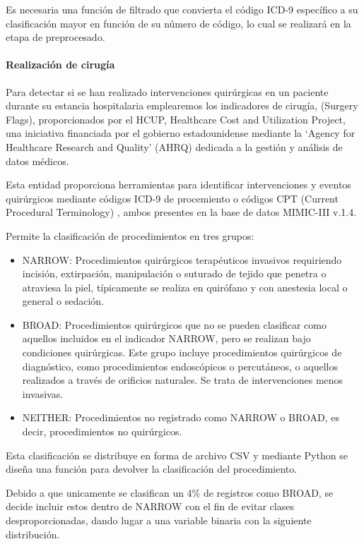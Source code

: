\documentclass{report}
\begin{document}
Es necesaria una función de filtrado que convierta el código ICD-9
específico a su clasificación mayor en función de su número de código,
lo cual se realizará en la etapa de preprocesado.

\paragraph{Realización de cirugía}

Para detectar si se han realizado intervenciones quirúrgicas en un
paciente durante su estancia hospitalaria emplearemos los indicadores de
cirugía, (Surgery Flags), proporcionados por el HCUP, Healthcare Cost
and Utilization Project, una iniciativa financiada por el gobierno
estadounidense mediante la `Agency for Healthcare Research and Quality'
(AHRQ) dedicada a la gestión y análisis de datos médicos.

Esta entidad proporciona herramientas para identificar intervenciones y
eventos quirúrgicos mediante códigos ICD-9 de procemiento o códigos CPT
(Current Procedural Terminology) , ambos presentes en la base de datos
MIMIC-III v.1.4.

Permite la clasificación de procedimientos en tres grupos:

\begin{itemize}
\item
  NARROW: Procedimientos quirúrgicos terapéuticos invasivos requiriendo
  incisión, extirpación, manipulación o suturado de tejido que penetra o
  atraviesa la piel, típicamente se realiza en quirófano y con anestesia
  local o general o sedación.
\item
  BROAD: Procedimientos quirúrgicos que no se pueden clasificar como
  aquellos incluidos en el indicador NARROW, pero se realizan bajo
  condiciones quirúrgicas. Este grupo incluye procedimientos quirúrgicos
  de diagnóstico, como procedimientos endoscópicos o percutáneos, o
  aquellos realizados a través de orificios naturales. Se trata de
  intervenciones menos invasivas.
\item
  NEITHER: Procedimientos no registrado como NARROW o BROAD, es decir,
  procedimientos no quirúrgicos. 
\end{itemize}

Esta clasificación se distribuye en forma de archivo CSV y mediante
Python se diseña una función para devolver la clasificación del
procedimiento.

Debido a que unicamente se clasifican un 4\% de registros como BROAD, se
decide incluir estos dentro de NARROW con el fin de evitar clases
desproporcionadas, dando lugar a una variable binaria con la siguiente
distribución.
\end{document}
